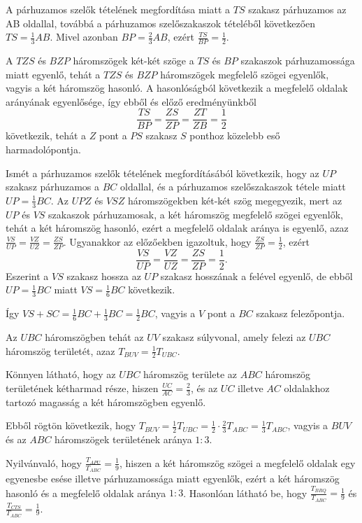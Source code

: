 \documentclass[a4paper,10pt]{article}
\begin{document}
A párhuzamos szelők tételének megfordítása miatt a $TS$ szakasz párhuzamos az AB
oldallal, továbbá a párhuzamos szelőszakaszok tételéből következően $TS=\frac13AB$. Mivel azonban $BP=\frac23AB$, ezért $\frac{TS}{BP}=\frac12$.

A $TZS$ és $BZP$ háromszögek két-két szöge a $TS$ és $BP$ szakaszok párhuzamossága miatt
egyenlő, tehát a $TZS$ és $BZP$ háromszögek megfelelő szögei egyenlők, vagyis a két
háromszög hasonló. A hasonlóságból következik a megfelelő oldalak arányának egyenlősége,
így ebből és előző eredményünkből \[\frac{TS}{BP}=\frac{ZS}{ZP}=\frac{ZT}{ZB}=\frac12\] következik, tehát a $Z$ pont a $PS$ szakasz $S$ ponthoz közelebb eső harmadolópontja.

Ismét a párhuzamos szelők tételének megfordításából következik, hogy az $UP$ szakasz
pár\-hu\-za\-mos a $BC$ oldallal, és a párhuzamos szelőszakaszok tétele miatt $UP=\frac13BC$.
Az $UPZ$ és $VSZ$ háromszögekben két-két szög megegyezik, mert az $UP$ és $VS$ szakaszok
párhuzamosak, a két háromszög megfelelő szögei egyenlők, tehát a két háromszög hasonló,
ezért a megfelelő oldalak aránya is egyenlő, azaz $\frac{VS}{UP}=\frac{VZ}{UZ}=\frac{ZS}{ZP}$. Ugyanakkor az előzőekben igazoltuk, hogy $\frac{ZS}{ZP}=\frac12$, ezért
\[\frac{VS}{UP}=\frac{VZ}{UZ}=\frac{ZS}{ZP}=\frac12.\]
Eszerint a $VS$ szakasz hossza az $UP$ szakasz hosszának a felével egyenlő, de ebből $UP=\frac13BC$ miatt $VS=\frac16BC$ következik.

Így $VS+SC=\frac16BC+\frac13BC=\frac12BC$, vagyis a $V$ pont a $BC$ szakasz felezőpontja.

Az $UBC$ háromszögben tehát az $UV$ szakasz súlyvonal, amely felezi az $UBC$ háromszög
területét, azaz $T_{BUV}=\frac12T_{UBC}$.

Könnyen látható, hogy az $UBC$ háromszög területe az $ABC$ háromszög területének
két\-har\-mad része, hiszen $\frac{UC}{AC}=\frac23$, és az $UC$ illetve $AC$ oldalakhoz tartozó magasság a két háromszögben egyenlő.

Ebből rögtön következik, hogy $T_{BUV}=\frac12T_{UBC}=\frac12\cdot\frac23T_{ABC}=\frac13T_{ABC}$, vagyis a $BUV$ és az $ABC$ háromszögek területének aránya $1:3$.

Nyilvánvaló, hogy $\frac{T_{APU}}{T_{ABC}}=\frac19$, hiszen a két háromszög
szögei a megfelelő oldalak egy egyenesbe esése illetve párhuzamossága miatt egyenlők, ezért
a két háromszög hasonló és a megfelelő oldalak aránya $1:3$. Hasonlóan látható be, hogy $\frac{T_{BRQ}}{T_{ABC}}=\frac19$ és $\frac{T_{CTS}}{T_{ABC}}=\frac19$.
\end{document}
